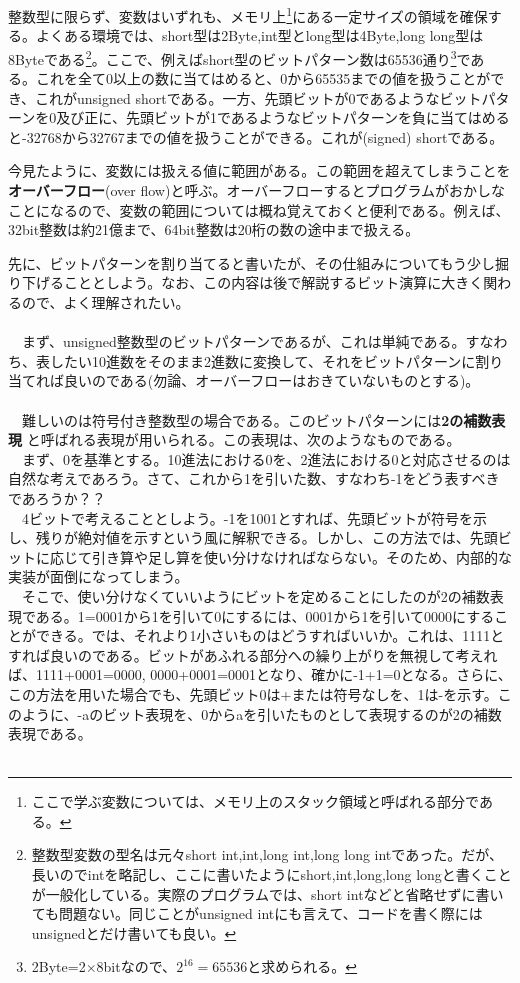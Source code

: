 整数型に限らず、変数はいずれも、メモリ上\footnote{ここで学ぶ変数については、メモリ上のスタック領域と呼ばれる部分である。}にある一定サイズの領域を確保する。よくある環境では、short型は2Byte,int型とlong型は4Byte,long long型は8Byteである\footnote{整数型変数の型名は元々short int,int,long int,long long intであった。だが、長いのでintを略記し、ここに書いたようにshort,int,long,long longと書くことが一般化している。実際のプログラムでは、short intなどと省略せずに書いても問題ない。同じことがunsigned intにも言えて、コードを書く際にはunsignedとだけ書いても良い。}。ここで、例えばshort型のビットパターン数は65536通り\footnote{2Byte=2$\times$8bitなので、$2^{16}=65536$と求められる。}である。これを全て0以上の数に当てはめると、0から65535までの値を扱うことができ、これがunsigned shortである。一方、先頭ビットが0であるようなビットパターンを0及び正に、先頭ビットが1であるようなビットパターンを負に当てはめると-32768から32767までの値を扱うことができる。これが(signed) shortである。

今見たように、変数には扱える値に範囲がある。この範囲を超えてしまうことを\textbf{オーバーフロー}(over flow)と呼ぶ。オーバーフローするとプログラムがおかしなことになるので、変数の範囲については概ね覚えておくと便利である。例えば、32bit整数は約21億まで、64bit整数は20桁の数の途中まで扱える。

先に、ビットパターンを割り当てると書いたが、その仕組みについてもう少し掘り下げることとしよう。なお、この内容は後で解説するビット演算に大きく関わるので、よく理解されたい。
\\ \\
　まず、unsigned整数型のビットパターンであるが、これは単純である。すなわち、表したい10進数をそのまま2進数に変換して、それをビットパターンに割り当てれば良いのである(勿論、オーバーフローはおきていないものとする)。
\\ \\
　難しいのは符号付き整数型の場合である。このビットパターンには\textbf{2の補数表現} と呼ばれる表現が用いられる。この表現は、次のようなものである。\\
　まず、0を基準とする。10進法における0を、2進法における0と対応させるのは自然な考えであろう。さて、これから1を引いた数、すなわち-1をどう表すべきであろうか？？\\
　4ビットで考えることとしよう。-1を1001とすれば、先頭ビットが符号を示し、残りが絶対値を示すという風に解釈できる。しかし、この方法では、先頭ビットに応じて引き算や足し算を使い分けなければならない。そのため、内部的な実装が面倒になってしまう。\\
　そこで、使い分けなくていいようにビットを定めることにしたのが2の補数表現である。1=0001から1を引いて0にするには、0001から1を引いて0000にすることができる。では、それより1小さいものはどうすればいいか。これは、1111とすれば良いのである。ビットがあふれる部分への繰り上がりを無視して考えれば、1111+0001=0000, 0000+0001=0001となり、確かに-1+1=0となる。さらに、この方法を用いた場合でも、先頭ビット0は+または符号なしを、1は-を示す。このように、-aのビット表現を、0からaを引いたものとして表現するのが2の補数表現である。\\ \\

